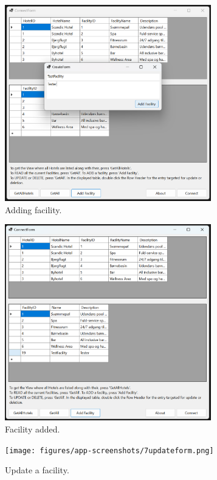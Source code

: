\begin{figure}
    \centering
    \includegraphics[width=0.8\textwidth]{figures/app-screenshots/5addfacility.png}
    \caption{Adding facility.}
    \label{fig:5addfacility}
\end{figure}

\begin{figure}
    \centering
    \includegraphics[width=0.8\textwidth]{figures/app-screenshots/6facilityadded.png}
    \caption{Facility added.}
    \label{fig:6facilityadded}
\end{figure}

\begin{figure}
    \centering
    \texttt{[image: figures/app-screenshots/7updateform.png]}
    \caption{Update a facility.}
    \label{fig:7updateform}
\end{figure}

